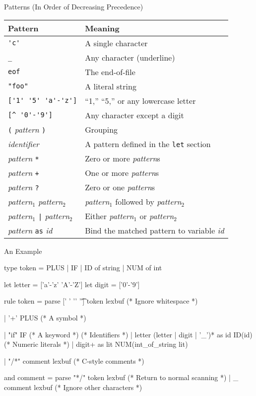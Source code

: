 \documentclass{plt}
\begin{document}
\begin{frame}[fragile]{Patterns (In Order of Decreasing Precedence)}
\footnotesize
\begin{tabular}{ll}
\toprule
\textbf{Pattern} & \textbf{Meaning} \\
\midrule
\verb|'c'| & A single character\\
\verb|_| & Any character (underline)\\
\verb|eof| & The end-of-file\\
\verb|"foo"| & A literal string\\
\verb|['1' '5' 'a'-'z']| & ``1,'' ``5,'' or any lowercase letter\\
\verb|[^ '0'-'9']| & Any character except a digit \\
\verb|(| \emph{pattern} \verb|)| & Grouping\\
\emph{identifier} & A pattern defined in the \texttt{let} section\\
\midrule
\emph{pattern} \verb|*| & Zero or more \emph{pattern}s\\
\emph{pattern} \verb|+| & One or more \emph{pattern}s\\
\midrule
\emph{pattern} \verb|?| & Zero or one \emph{pattern}s\\
\midrule
\emph{pattern}$_1$ \emph{pattern}$_2$  & \emph{pattern}$_1$ followed by \emph{pattern}$_2$\\
\midrule
\emph{pattern}$_1$ \verb+|+ \emph{pattern}$_2$  & Either \emph{pattern}$_1$ or \emph{pattern}$_2$\\
\midrule
\emph{pattern} \verb|as| \emph{id}  & Bind the matched pattern to variable \emph{id}\\
\bottomrule
\end{tabular}

\end{frame}

\begin{frame}[fragile]{An Example}
\small
\begin{ocamllex}
{ type token = PLUS | IF | ID of string | NUM of int }

let letter = ['a'-'z' 'A'-'Z']
let digit = ['0'-'9']

rule token =
 parse [' ' '\n' '\t'] { token lexbuf } (* Ignore whitespace *)

     | '+' { PLUS }                     (* A symbol *)

     | "if" { IF }                      (* A keyword *)
                                        (* Identifiers *)
     | letter (letter | digit | '_')* as id { ID(id) }
                                        (* Numeric literals *)
     | digit+ as lit { NUM(int_of_string lit) }

     | "/*" { comment lexbuf }          (* C-style comments *)

and comment =
  parse "*/" { token lexbuf } (* Return to normal scanning *)
      | _ { comment lexbuf }  (* Ignore other characters *)
\end{ocamllex}

\end{frame}
\end{document}
